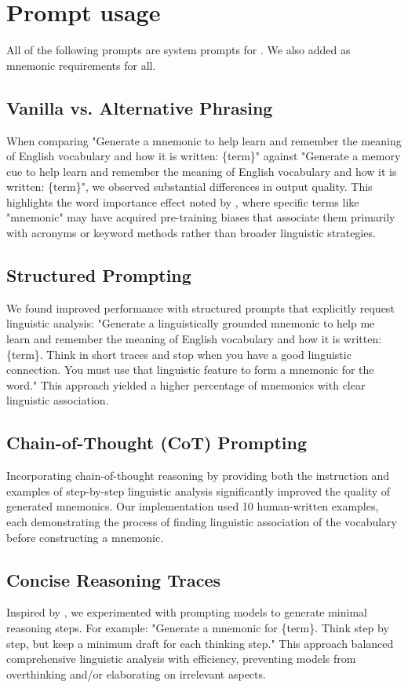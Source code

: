 
\section{Prompt usage} \label{app:prompt-usage}

All of the following prompts are system prompts for \teachermodel. We also added  as mnemonic requirements for all.

\subsection*{Vanilla vs. Alternative Phrasing} When comparing "Generate a mnemonic to help learn and remember the meaning of English vocabulary and how it is written: \{term\}" against "Generate a memory cue to help learn and remember the meaning of English vocabulary and how it is written: \{term\}", we observed substantial differences in output quality. This highlights the word importance effect noted by \citet{hackmannWordImportanceExplains2024}, where specific terms like "mnemonic" may have acquired pre-training biases that associate them primarily with acronyms or keyword methods rather than broader linguistic strategies.

\subsection*{Structured Prompting} We found improved performance with structured prompts that explicitly request linguistic analysis: "Generate a linguistically grounded mnemonic to help me learn and remember the meaning of English vocabulary and how it is written: \{term\}. Think in short traces and stop when you have a good linguistic connection. You must use that linguistic feature to form a mnemonic for the word." This approach yielded a higher percentage of mnemonics with clear linguistic association.

\subsection*{Chain-of-Thought (CoT) Prompting} Incorporating chain-of-thought reasoning by providing both the instruction and examples of step-by-step linguistic analysis significantly improved the quality of generated mnemonics. Our implementation used 10 human-written examples, each demonstrating the process of finding linguistic association of the vocabulary before constructing a mnemonic.

\subsection*{Concise Reasoning Traces} Inspired by \citet{xuChainDraftThinking2025}, we experimented with prompting models to generate minimal reasoning steps. For example: "Generate a mnemonic for \{term\}. Think step by step, but keep a minimum draft for each thinking step." This approach balanced comprehensive linguistic analysis with efficiency, preventing models from overthinking and/or elaborating on irrelevant aspects.
